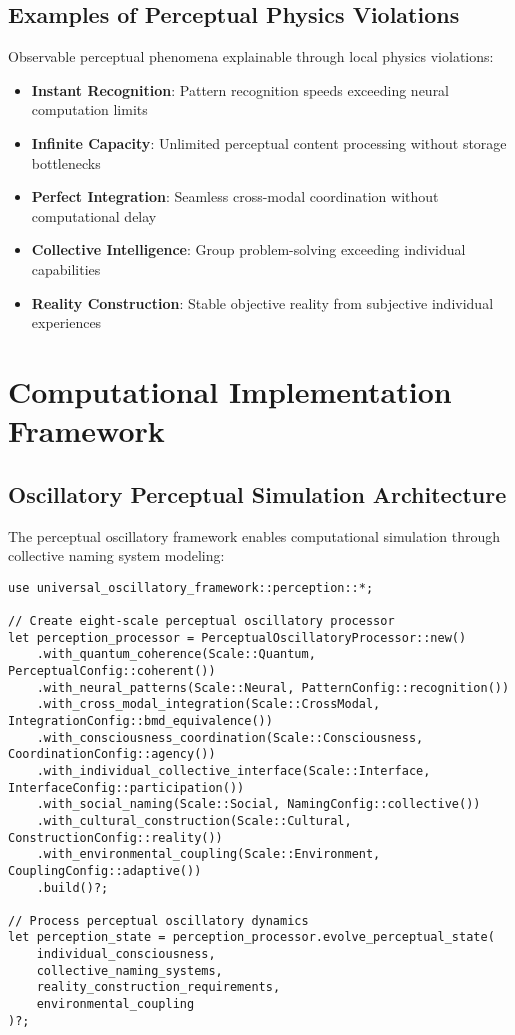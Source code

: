 \documentclass[12pt,a4paper]{article}
\begin{document}
\subsection{Examples of Perceptual Physics Violations}

Observable perceptual phenomena explainable through local physics violations:

\begin{itemize}
\item \textbf{Instant Recognition}: Pattern recognition speeds exceeding neural computation limits
\item \textbf{Infinite Capacity}: Unlimited perceptual content processing without storage bottlenecks
\item \textbf{Perfect Integration}: Seamless cross-modal coordination without computational delay
\item \textbf{Collective Intelligence}: Group problem-solving exceeding individual capabilities
\item \textbf{Reality Construction}: Stable objective reality from subjective individual experiences
\end{itemize}

\section{Computational Implementation Framework}

\subsection{Oscillatory Perceptual Simulation Architecture}

The perceptual oscillatory framework enables computational simulation through collective naming system modeling:

\begin{verbatim}
use universal_oscillatory_framework::perception::*;

// Create eight-scale perceptual oscillatory processor
let perception_processor = PerceptualOscillatoryProcessor::new()
    .with_quantum_coherence(Scale::Quantum, PerceptualConfig::coherent())
    .with_neural_patterns(Scale::Neural, PatternConfig::recognition())
    .with_cross_modal_integration(Scale::CrossModal, IntegrationConfig::bmd_equivalence())
    .with_consciousness_coordination(Scale::Consciousness, CoordinationConfig::agency())
    .with_individual_collective_interface(Scale::Interface, InterfaceConfig::participation())
    .with_social_naming(Scale::Social, NamingConfig::collective())
    .with_cultural_construction(Scale::Cultural, ConstructionConfig::reality())
    .with_environmental_coupling(Scale::Environment, CouplingConfig::adaptive())
    .build()?;

// Process perceptual oscillatory dynamics
let perception_state = perception_processor.evolve_perceptual_state(
    individual_consciousness,
    collective_naming_systems,
    reality_construction_requirements,
    environmental_coupling
)?;
\end{verbatim}
\end{document}

